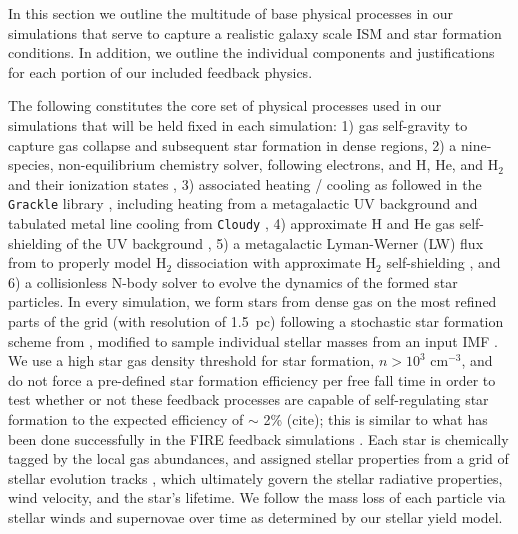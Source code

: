 \documentclass[11pt]{article}
\begin{document}
In this section we outline the multitude of base physical processes in our simulations that serve to capture a realistic galaxy scale ISM and star formation conditions. In addition, we outline the individual components and justifications for each portion of our included feedback physics.

The following constitutes the core set of physical processes used in our simulations that will be held fixed in each simulation: 1) gas self-gravity to capture gas collapse and subsequent star formation in dense regions, 2) a nine-species, non-equilibrium chemistry solver, following electrons, and H, He, and H$_{2}$ and their ionization states \citep{Anninos1997, Abel1997}, 3) associated heating / cooling as followed in the \texttt{Grackle} library \citep{Grackle}, including heating from a metagalactic UV background \citep{HM2012} and tabulated metal line cooling from \texttt{Cloudy} \citep{Cloudy2013}, 4) approximate H and He gas self-shielding of the UV background \citep{Rahmati2013}, 5) a metagalactic Lyman-Werner (LW) flux from \cite{HM2012} to properly model H$_{2}$ dissociation with approximate H$_{2}$ self-shielding \citep{Wolcott-Green2011}, and 6) a collisionless N-body solver to evolve the dynamics of the formed star particles. In every simulation, we form stars from dense gas on the most refined parts of the grid (with resolution of 1.5~pc) following a stochastic star formation scheme from \cite{Goldbaum2015, Goldbaum2016}, modified to sample individual stellar masses from an input IMF \citep[e.g.][]{Salpeter1955}. We use a high star gas density threshold for star formation, $n > 10^{3}$ cm$^{-3}$, and do not force a pre-defined star formation efficiency per free fall time in order to test whether or not these feedback processes are capable of self-regulating star formation to the expected efficiency of $\sim$ 2\% (cite); this is similar to what has been done successfully in the FIRE feedback simulations \citep[e.g][]{FIRE}. Each star is chemically tagged by the local gas abundances, and assigned stellar properties from a grid of stellar evolution tracks \citep{Bressan2012}, which ultimately govern the stellar radiative properties, wind velocity, and the star's lifetime. We follow the mass loss of each particle via stellar winds and supernovae over time as determined by our stellar yield model.
\end{document}

